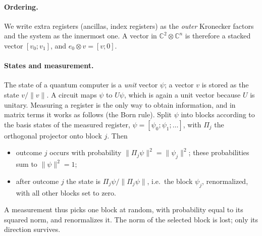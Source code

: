 \documentclass[11pt,a4paper]{article}
\newcommand{\C}{\mathbb{C}}
\begin{document}
\paragraph{Ordering.} We write extra registers (ancillas, index registers) as
the \emph{outer} Kronecker factors and the system as the innermost one. A
vector in $\C^2\otimes\C^n$ is therefore a stacked vector $[v_0;v_1]$, and $e_0\otimes v=[v;0]$.

\paragraph{States and measurement.} The state of a quantum computer is a
\emph{unit} vector $\psi$; a vector $v$ is stored as the state $v/\|v\|$. A circuit
maps $\psi$ to $U\psi$, which is again a unit vector because $U$ is unitary.
Measuring a register is the only way to obtain information, and in matrix
terms it works as follows (the Born rule). Split $\psi$ into blocks according
to the basis states of the measured register, $\psi=[\psi_0;\psi_1;\dots]$, with
$\Pi_j$ the orthogonal projector onto block $j$. Then
\begin{itemize}
\item outcome $j$ occurs with probability $\|\Pi_j\psi\|^2=\|\psi_j\|^2$; these
  probabilities sum to $\|\psi\|^2=1$;
\item after outcome $j$ the state is $\Pi_j\psi/\|\Pi_j\psi\|$, i.e.\ the block $\psi_j$,
  renormalized, with all other blocks set to zero.
\end{itemize}
A measurement thus picks one block at random, with probability equal to
its squared norm, and renormalizes it. The norm of the selected block is
lost; only its direction survives.
\end{document}

